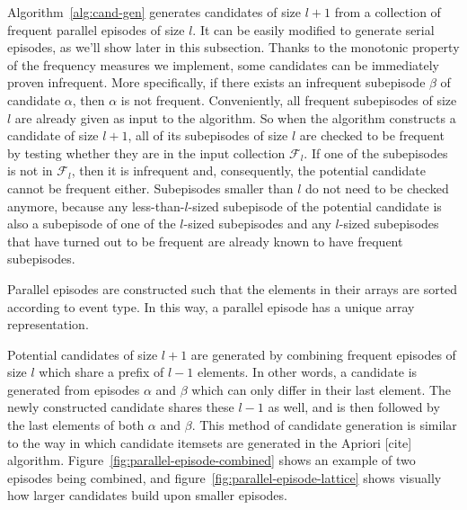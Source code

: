 
Algorithm~\ref{alg:cand-gen} generates candidates of size $ l + 1 $ from a collection of frequent parallel episodes of size $ l $. It can be easily modified to generate serial episodes, as we'll show later in this subsection. Thanks to the monotonic property of the frequency measures we implement, some candidates can be immediately proven infrequent. More specifically, if there exists an infrequent subepisode $ \beta $ of candidate $ \alpha $, then $ \alpha $ is not frequent.
Conveniently, all frequent subepisodes of size $ l $ are already given as input to the algorithm. So when the algorithm constructs a candidate of size $ l + 1 $, all of its subepisodes of size $ l $ are checked to be frequent by testing whether they are in the input collection $ \mathcal{F}_l $. If one of the subepisodes is not in $ \mathcal{F}_l $, then it is infrequent and, consequently, the potential candidate cannot be frequent either.
Subepisodes smaller than $ l $ do not need to be checked anymore, because any less-than-$ l $-sized subepisode of the potential candidate is also a subepisode of one of the $ l $-sized subepisodes and any $ l $-sized subepisodes that have turned out to be frequent are already known to have frequent subepisodes.

Parallel episodes are constructed such that the elements in their arrays are sorted according to event type. In this way, a parallel episode has a unique array representation.

Potential candidates of size $ l + 1 $ are generated by combining frequent episodes of size $ l $ which share a prefix of $ l - 1 $ elements. In other words, a candidate is generated from episodes $ \alpha $ and $ \beta $ which can only differ in their last element. The newly constructed candidate shares these $ l - 1 $ as well, and is then followed by the last elements of both $ \alpha $ and $ \beta $. This method of candidate generation is similar to the way in which candidate itemsets are generated in the Apriori [cite] algorithm. Figure~\ref{fig:parallel-episode-combined} shows an example of two episodes being combined, and figure~\ref{fig:parallel-episode-lattice} shows visually how larger candidates build upon smaller episodes.

